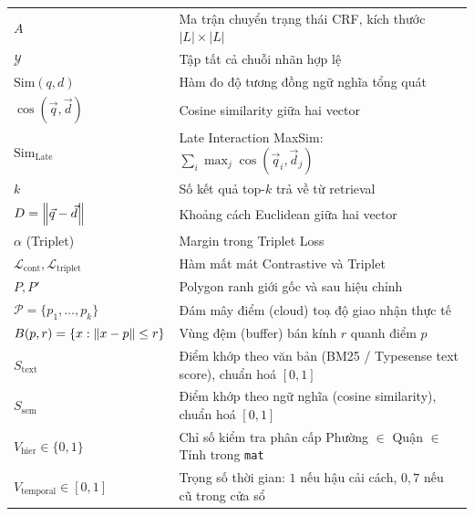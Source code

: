 \begin{longtable}{p{4cm} p{10.4cm}}
$A$
& Ma trận chuyển trạng thái CRF, kích thước $|L| \times |L|$ \\

$\mathcal{Y}$
& Tập tất cả chuỗi nhãn hợp lệ \\

$\mathrm{Sim}(q, d)$
& Hàm đo độ tương đồng ngữ nghĩa tổng quát \\

$\cos(\vec{q}, \vec{d})$
& Cosine similarity giữa hai vector \\

$\mathrm{Sim}_{\text{Late}}$
& Late Interaction MaxSim: $\sum_i \max_j \cos(\vec{q}_i, \vec{d}_j)$ \\

$k$
& Số kết quả top-$k$ trả về từ retrieval \\

$D = \left\lVert\vec{q} - \vec{d}\right\rVert$
& Khoảng cách Euclidean giữa hai vector \\

$\alpha$ (Triplet)
& Margin trong Triplet Loss \\

$\mathcal{L}_{\text{cont}}, \mathcal{L}_{\text{triplet}}$
& Hàm mất mát Contrastive và Triplet \\

$P, P'$
& Polygon ranh giới gốc và sau hiệu chỉnh \\

$\mathcal{P} = \{p_1, \dots, p_k\}$
& Đám mây điểm (cloud) toạ độ giao nhận thực tế \\

$B(p, r) = \{x : \left\lVert x - p\right\rVert \le r\}$
& Vùng đệm (buffer) bán kính $r$ quanh điểm $p$ \\

$S_{\text{text}}$
& Điểm khớp theo văn bản (BM25 / Typesense text score), chuẩn hoá $[0,1]$ \\

$S_{\text{sem}}$
& Điểm khớp theo ngữ nghĩa (cosine similarity), chuẩn hoá $[0,1]$ \\

$V_{\text{hier}} \in \{0, 1\}$
& Chỉ số kiểm tra phân cấp Phường $\in$ Quận $\in$ Tỉnh trong \texttt{mat} \\

$V_{\text{temporal}} \in [0, 1]$
& Trọng số thời gian: $1$ nếu hậu cải cách, $0{,}7$ nếu cũ trong cửa sổ \\


\end{longtable}
